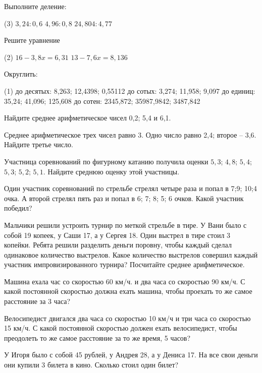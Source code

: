 %
%

\begin{class}[number=1]
	\begin{listofex}
		\item Выполните деление:\begin{tasks}(3)
			\task \( 3,24:0,6 \)
			\task \( 4,96 : 0,8 \)
			\task \( 24,804 : 4,77 \)
		\end{tasks}
		\item Решите уравнение \begin{tasks}(2)
			\task \( 16-3,8x = 6,31 \)
			\task \( 13 -7,6x = 8,136 \)
		\end{tasks} 
		\item Округлить:
		\begin{tasks}(1)
			\task до десятых: 8,263;   12,4398;    0,55112
			\task до сотых: 3,274;   11,958;   9,097
			\task до единиц: 35,24;   41,096;   125,608
			\task до сотен: 2345,872;   35987,9842;   3487,842
		\end{tasks} 
		\item Найдите среднее арифметическое чисел 0,2; 5,4 и 6,1.
		\item Среднее арифметическое трех чисел равно 3. Одно число равно 2,4; второе – 3,6. Найдите третье число.
		\item Участница соревнований по фигурному катанию получила оценки \( 5,3 \); \( 4,8 \); \( 5,4 \); \(  5,3 \);  \( 5,2 \); \(  5,1 \). Найдите среднюю оценку этой участницы.                                                                                                                                            
		\item Один участник соревнований по стрельбе стрелял четыре раза и попал в 7;9; 10;4 очка. А второй стрелял пять раз и попал в 6; 7; 8; 5; 6 очков. Какой участник победил?    
		\item Мальчики решили устроить турнир по меткой стрельбе в тире. У Вани было с собой 19 копеек, у Саши 17, а у Сергея 18. Один выстрел в тире стоил 3 копейки. Ребята решили разделить деньги поровну, чтобы каждый сделал одинаковое количество выстрелов. Какое количество выстрелов совершил каждый участник импровизированного турнира? Посчитайте среднее арифметическое.
		\item Машина ехала час со скоростью 60 км/ч. и два часа со скоростью 90 км/ч. С какой постоянной скоростью должна ехать машина, чтобы проехать то же самое расстояние за 3 часа? 
		\item Велосипедист двигался два часа со скоростью   10 км/ч  и три часа со скоростью   15 км/ч.   С какой постоянной скоростью должен  ехать велосипедист, чтобы преодолеть то же самое расстояние за то же  время, 5 часов?    
		\item У Игоря было с собой   45 рублей, у Андрея   28, а у Дениса   17. На все свои деньги они купили 3 билета в кино. Сколько стоил один билет?  
		
	\end{listofex}
\end{class}

